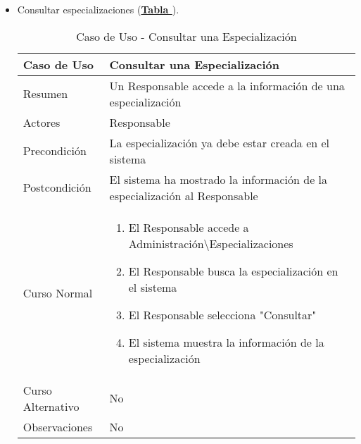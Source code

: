 \begin{itemize}
	\item \addtocounter{tabla}{1} Consultar especializaciones (\textbf{\hyperref[tab:curConsultarEspec]{Tabla }}).
		\begin{table}[!htbp]
		  \centering  \addtocounter{casouso}{1}
		  \begin{tabular}{|l | p{100mm}|}
		    \textbf{Caso de Uso}  & \textbf{Consultar una Especialización} \\ \hline
		    Resumen 		 & Un Responsable accede a la información de una especialización \\ \hline
		    Actores  		 & Responsable \\ \hline
		    Precondición  	 & La especialización ya debe estar creada en el sistema  \\ \hline
		    Postcondición  	 & El sistema ha mostrado la información de la especialización al Responsable \\ \hline
		    Curso Normal   	 & \begin{enumerate}
			  \item El Responsable accede a Administración\textbackslash Especializaciones
			  \item El Responsable busca la especialización en el sistema
			  \item El Responsable selecciona "Consultar"
			  \item El sistema muestra la información de la especialización
		    \end{enumerate}  \\ \hline
		    Curso Alternativo  & No  \\ \hline
		    Observaciones 	 & No  \\ \hline
		  \end{tabular}
		  \caption{Caso de Uso  - Consultar una Especialización}
		  \label{tab:curConsultarEspec}
		\end{table}
		\FloatBarrier
	

\end{itemize}
